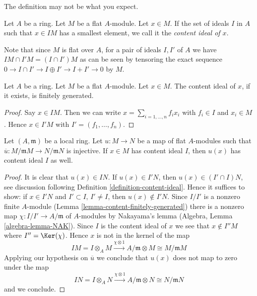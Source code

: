 \noindent
The definition may not be what you expect.

\begin{definition}
\label{definition-content-ideal}
Let $A$ be a ring. Let $M$ be a flat $A$-module. Let $x \in M$.
If the set of ideals $I$ in $A$ such that $x \in IM$ has a
smallest element, we call it the {\it content ideal of $x$}.
\end{definition}

\noindent
Note that since $M$ is flat over $A$, for a pair of ideals $I, I'$
of $A$ we have $IM \cap I'M = (I \cap I')M$
as can be seen by tensoring the exact sequence
$0 \to I \cap I' \to I \oplus I' \to I + I' \to 0$ by $M$.

\begin{lemma}
\label{lemma-content-finitely-generated}
Let $A$ be a ring. Let $M$ be a flat $A$-module. Let $x \in M$.
The content ideal of $x$, if it exists, is finitely generated.
\end{lemma}

\begin{proof}
Say $x \in IM$. Then we can write $x = \sum_{i = 1, \ldots, n} f_i x_i$ with
$f_i \in I$ and $x_i \in M$. Hence $x \in I'M$ with
$I' = (f_1, \ldots, f_n)$.
\end{proof}

\begin{lemma}
\label{lemma-equal-content}
Let $(A, \mathfrak m)$ be a local ring. Let $u : M \to N$ be a map of flat
$A$-modules such that $\overline{u} : M/\mathfrak m M \to N/\mathfrak m N$
is injective. If $x \in M$ has content ideal $I$, then $u(x)$ has content
ideal $I$ as well.
\end{lemma}

\begin{proof}
It is clear that $u(x) \in IN$. If $u(x) \in I'N$, then
$u(x) \in (I' \cap I)N$, see discussion following
Definition \ref{definition-content-ideal}. Hence it suffices to
show: if $x \in I'N$ and $I' \subset I$, $I' \not =  I$, then
$u(x) \not \in I'N$. Since $I/I'$ is a nonzero finite $A$-module
(Lemma \ref{lemma-content-finitely-generated}) there is a nonzero map
$\chi : I/I' \to A/\mathfrak m$ of $A$-modules
by Nakayama's lemma (Algebra, Lemma \ref{algebra-lemma-NAK}).
Since $I$ is the content ideal of $x$ we see that
$x \not \in I''M$ where $I'' = \Ker(\chi)$.
Hence $x$ is not in the kernel of the map
$$
IM = I \otimes_A M \xrightarrow{\chi \otimes 1}
A/\mathfrak m \otimes M \cong M/\mathfrak m M
$$
Applying our hypothesis on $\overline{u}$ we conclude that
$u(x)$ does not map to zero under the map
$$
IN = I \otimes_A N \xrightarrow{\chi \otimes 1}
A/\mathfrak m \otimes N \cong N/\mathfrak m N
$$
and we conclude.
\end{proof}

